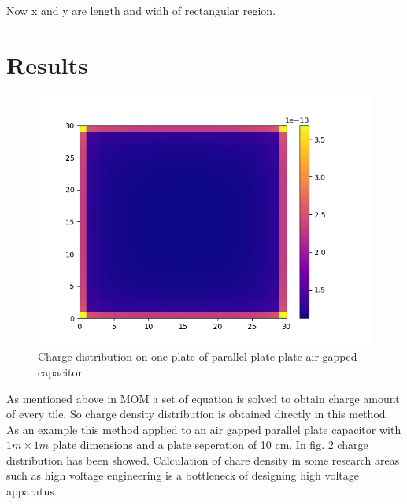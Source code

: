 \documentclass[twoside,twocolumn]{article}
\begin{document}
Now x and y are length and widh of rectangular region.
\section{Results}
\begin {figure}
	\center
	\includegraphics[width=\linewidth]	{chargedistribution.png}
	\caption{Charge distribution on one plate of parallel plate plate air gapped capacitor}
\end{figure}
As mentioned above in MOM a set of equation is solved to obtain charge amount of every tile. So charge density distribution is obtained directly in this method. As an example this method applied to an air gapped parallel plate capacitor with  $1m \times 1m $ plate dimensions and a plate seperation of 10 cm. In fig. 2 charge distribution has been showed. Calculation of chare density in some research areas such as high voltage engineering is a bottleneck of designing high voltage apparatus.
\end{document}
